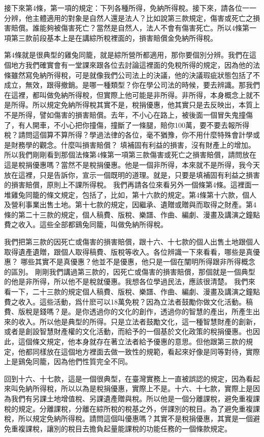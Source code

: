 \documentclass[]{ctexbook}
\begin{document}
接下來第4條，第一項的規定：下列各種所得，免納所得稅。接下來，請各位一一分辨，他主體適用的對象是自然人還是法人？比如說第三款規定，傷害或死亡之損害賠償。誰能夠被傷害死亡？當然是自然人，法人不會有傷害死亡。所以4條第一項第三款前段基本上是在講綜所稅裡面的，損害賠償金免納所得稅。

第4條就是很典型的雞兔同籠，就是綜所營所都適用，那你要個別分辨。我們在這個地方我們確實會有一堂課來跟各位去討論這裡面的免稅所得的規定，因為他的法條雖然寫免納所得稅，可是就像我們公司法上的決議，他的決議瑕疵狀態包括了不成立，無效，跟得撤銷。是哪一種類型？你在學公司法的時候，要去辨識。那我們在這裡，都叫做免納所得稅，但實際上他可能是非所得。非所得，本身概念上就不是所得。所以規定免納所得稅其實不是，稅捐優惠，他其實只是去反映出，本質上不是所得，譬如傷害的損害賠償。去年，不小心在路上，被後面一個冒失鬼撞傷了，有人開車，不小心把你撞傷，撞斷了一條腿，賠你100萬，要不要去報所得稅？請問這個算不算所得？學過法律的各位，毫不猶豫，你不用什麼特殊會計學或是財務學的觀念。什麼叫損害賠償？ 填補固有利益的損害，沒有財產上的增加。所以我們剛剛看到那個法條第4條第一項第三款傷害或死亡之損害賠償，請問放在這是稅捐優惠嗎？當然不是稅捐優惠。他是一個非所得，本來就不是所得，我今天放在這裡，只是告訴你，宣示一個既明的道理。就是，只要是填補固有利益之損害的損害賠償，原則上不課所得稅。
我們再請各位來看另外一個條第4條。這裡面一堆雞兔同籠的條文規定，包括了，比如，第十六款的規定。第4條第十六款，個人及營利事業出售土地。第十七款的規定，因繼承、遺贈或贈與而取得之財產。第4條的第二十三款的規定，個人稿費、版稅、樂譜、作曲、編劇、漫畫及講演之鐘點費之收入。這些全部都鷄兔同籠，叫做免納所得稅。

我們把第三款的因死亡或傷害的損害賠償，跟十六、十七款的個人出售土地跟個人取得遺產遺贈，跟個人取得稿費、版稅等收入。各位辨識一下來看看，哪些是真優惠？ 哪些其實不是真優惠？他並不是優惠，他只是一個在闡明所得跟非所得概念的區別。
剛剛我們講過第三款的，因死亡或傷害的損害賠償，那個就是一個典型的他是非所得，所以他不是稅就優惠。我想各位學過民法，應該很清楚。
我們來看一下，二十三款的規定個人稿費、版稅、樂譜、作曲、編劇、漫畫及講演之鐘點費之收入。這些活動，爲什麽可以18萬免稅？因為立法者鼓勵你做文化活動。稿費、版稅是錢嗎？是。是你透過你的文化的創作，透過你的智慧的產出，所產生出來的收入。所以他是典型的所得。只是立法者鼓勵文化，這一種智慧財產的創新，或者是創設智慧財產權的文化活動，而給予的一個基於文化政策的稅捐優惠。也因此，這個條文規定，他本身就存在著立法者給予優惠的意思。但他跟第三款的規定，他都同樣放在這個地方裡面去做一致性的規範，看起來好像是同等對待，實際上是鷄兔同籠，因為他們性質完全不同。

回到十六、十七款，這是一個很典型，在臺灣實務上一直被誤認的規定，因為看起來叫免納所得稅，所以以為是稅捐優惠，實際上不是。十六、十七款，實際上是因為我們有另課土地增值稅、另課遺產贈與稅。所以他是一個分離課稅，避免重複課稅的規定。分離課稅，分離在綜所稅的稅基之外，併課別的稅目。為了避免重複課稅，所以規定免納所得稅。請問這個叫優惠嗎？其實不是稅捐優惠，其實是一個避免重複課稅，讓別的稅目去擔負起量能課稅的功能任務的一個條款規定。
\end{document}
